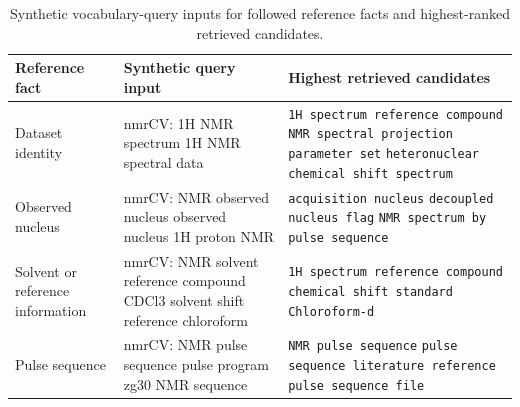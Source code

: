 \begin{table}[htbp]
    \centering
    \caption{Synthetic vocabulary-query inputs for followed reference facts and highest-ranked retrieved candidates.}
    \label{tab:evaluation-grounding-synthetic-query-results}
    \footnotesize
    \setlength{\tabcolsep}{4pt}
    \renewcommand{\arraystretch}{1.18}
    \begin{tabularx}{\textwidth}{>{\raggedright\arraybackslash}p{}>{\raggedright\arraybackslash}p{}>{\raggedright\arraybackslash}X}
        \toprule
        \textbf{Reference fact} & \textbf{Synthetic query input} & \textbf{Highest retrieved candidates} \\
        \midrule
        Dataset identity &
        \ac{nmrCV}:\newline
        1H NMR spectrum\newline
        1H NMR spectral data &
        \texttt{1H spectrum reference compound}\newline
        \texttt{NMR spectral projection parameter set}\newline
        \texttt{heteronuclear chemical shift spectrum} \\
        Observed nucleus &
        \ac{nmrCV}:\newline
        NMR observed nucleus\newline
        observed nucleus 1H proton NMR &
        \texttt{acquisition nucleus}\newline
        \texttt{decoupled nucleus flag}\newline
        \texttt{NMR spectrum by pulse sequence} \\
        Solvent or reference information &
        \ac{nmrCV}:\newline
        NMR solvent reference compound\newline
        CDCl3 solvent shift reference chloroform &
        \texttt{1H spectrum reference compound}\newline
        \texttt{chemical shift standard}\newline
        \texttt{Chloroform-d} \\
        Pulse sequence &
        \ac{nmrCV}:\newline
        NMR pulse sequence\newline
        pulse program zg30 NMR sequence &
        \texttt{NMR pulse sequence}\newline
        \texttt{pulse sequence literature reference}\newline
        \texttt{pulse sequence file} \\

\end{tabularx}
\end{table}
